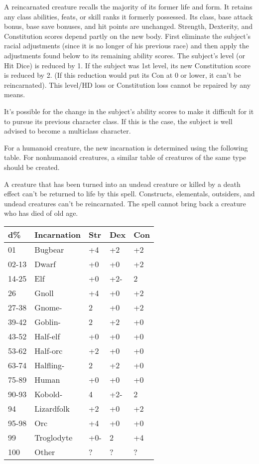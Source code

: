 \documentclass{article}
\begin{document}
A reincarnated creature recalls the majority of its former life and form. It retains 
any class abilities, feats, or skill ranks it formerly possessed. Its class, base 
attack bonus, base save bonuses, and hit points are unchanged. Strength, Dexterity, 
and Constitution scores depend partly on the new body. First eliminate the subject's 
racial adjustments (since it is no longer of his previous race) and then apply 
the adjustments found below to its remaining ability scores. The subject's level 
(or Hit Dice) is reduced by 1. If the subject was 1st level, its new Constitution 
score is reduced by 2. (If this reduction would put its Con at 0 or lower, it can't 
be reincarnated). This level/HD loss or Constitution loss cannot be repaired by 
any means.

It's possible for the change in the subject's ability scores to make it difficult 
for it to pursue its previous character class. If this is the case, the subject 
is well advised to become a multiclass character.

For a humanoid creature, the new incarnation is determined using the following 
table. For nonhumanoid creatures, a similar table of creatures of the same type 
should be created.

A creature that has been turned into an undead creature or killed by a death effect 
can't be returned to life by this spell.  Constructs, elementals, outsiders, and 
undead creatures can't be reincarnated. The spell cannot bring back a creature 
who has died of old age.

\begin{tabular}{|>{\raggedright}p{23pt}|>{\raggedright}p{49pt}|>{\raggedright}p{12pt}|>{\raggedright}p{15pt}|>{\raggedright}p{16pt}|}
\hline
d\textbf{\%} & I\textbf{ncarnation} & S\textbf{tr} & D\textbf{ex} & C\textbf{on}\tabularnewline
\hline
01 & Bugbear & +4 & +2 & +2\tabularnewline
\hline
02-13 & Dwarf & +0 & +0 & +2\tabularnewline
\hline
14-25 & Elf & +0 & +2- & 2\tabularnewline
\hline
26 & Gnoll & +4 & +0 & +2\tabularnewline
\hline
27-38 & Gnome- & 2 & +0 & +2\tabularnewline
\hline
39-42 & Goblin- & 2 & +2 & +0\tabularnewline
\hline
43-52 & Half-elf & +0 & +0 & +0\tabularnewline
\hline
53-62 & Half-orc & +2 & +0 & +0\tabularnewline
\hline
63-74 & Halfling- & 2 & +2 & +0\tabularnewline
\hline
75-89 & Human & +0 & +0 & +0\tabularnewline
\hline
90-93 & Kobold- & 4 & +2- & 2\tabularnewline
\hline
94 & Lizardfolk & +2 & +0 & +2\tabularnewline
\hline
95-98 & Orc & +4 & +0 & +0\tabularnewline
\hline
99 & Troglodyte & +0- & 2 & +4\tabularnewline
\hline
100 & Other & ? & ? & ?\tabularnewline
\hline
\end{tabular}
\end{document}
